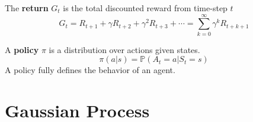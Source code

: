 			\begin{definition}[Return]
				The \textbf{return} $G_t$ is the total discounted reward from time-step $t$
				\begin{equation}
					G_t = R_{t+1} + \gamma R_{t+2} + \gamma^2 R_{t+3} + \cdots = \sum_{k = 0}^\infty \gamma^k R_{t+k+1}
				\end{equation}
			\end{definition}


			\begin{definition}[Policy]
				A \textbf{policy} $\pi$ is a distribution over actions given states.
				\begin{equation}
					\pi(a|s) = \mathbb{P}(A_t = a|S_t = s)
				\end{equation}
				A policy fully defines the behavior of an agent.
			\end{definition}

	\chapter{Gaussian Process}
		

